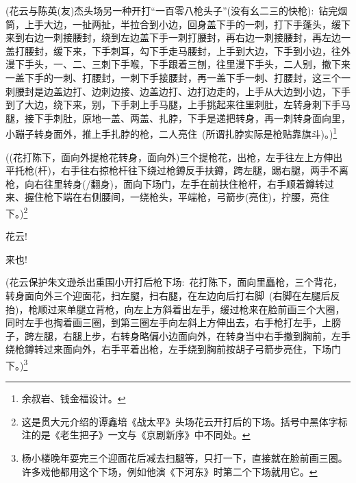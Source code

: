 {\vspace{5pt}
({花云与陈英(友)杰头场另一种开打``{\hei 一百零八枪头子}''}({没有幺二三的快枪}):~{\hwfs 钻完烟筒}，上手{\hwfs 大边}，{\hwfs 一扯两扯}，{\hwfs 半拉合到小边}，{\hwfs 回身盖}下手{\hwfs 的一刺}，{\hwfs 打}下手{\hwfs 蓬头}，{\hwfs 缓下来到右边一刺接腰封}，{\hwfs 绕到左边盖}下手{\hwfs 一刺打腰封}，{\hwfs 再右边一刺接腰封}，{\hwfs 再左边一盖打腰封}，{\hwfs 缓下来}，下手{\hwfs 刺耳}，{\hwfs 勾}下手{\hwfs 走马腰封}，上手{\hwfs 到大边}，下手{\hwfs 到小边}，{\hwfs 往外漫}下手{\hwfs 头}，{\hwfs 一}、{\hwfs 二}、{\hwfs 三刺}下手{\hwfs 喉}，下手{\hwfs 跟着三刨}，{\hwfs 往里漫下手头}，二人{\hwfs 别}，{\hwfs 撤下来一盖}下手{\hwfs 的一刺}、{\hwfs 打腰封}，{\hwfs 一刺}下手{\hwfs 接腰封}，{\hwfs 再一盖}下手{\hwfs 一刺}、{\hwfs 打腰封}，{\hwfs 这三个一刺腰封是边盖边打}、{\hwfs 边刺边接}、{\hwfs 边盖边打}、{\hwfs 边打边走的}，上手{\hwfs 从大边到小边}，下手{\hwfs 到了大边}，{\hwfs 绕下来}，{\hwfs 别}，下手{\hwfs 刺}上手{\hwfs 马腿}，上手{\hwfs 挑起来往里刺肚}，{\hwfs 左转身刺}下手{\hwfs 马腿}，{\hwfs 接}下手{\hwfs 刺肚}，{\hwfs 原地一盖}、{\hwfs 两盖}、{\hwfs 扎脖}，下手{\hwfs 是递把转身}，{\hwfs 再一刺转身面向里}，{\hwfs 小蹦子转身面外}，{\hwfs 推}上手{\hwfs 扎脖的枪}，二人{\hwfs 亮住}~({\hwfs 所谓扎脖实际是枪贴靠旗斗})。)\footnote{余叔岩、钱金福设计。}

\vspace{5pt}
((花{\hei 打}陈{\hei 下}，{\hei 面向外提枪花转身}，{\hei 面向外}){\hwfs 三个提枪花}，{\hwfs 出枪}，{\hwfs 左手往左上方伸出平托枪}({\hei 杆})，{\hwfs 右手往右掠枪杆往下绕过枪鐏反手扶鐏}，{\hwfs 跨左腿}，{\hwfs 踢右腿}，{\hwfs 两手不离枪}，{\hwfs 向右往里转身}(/{\hei 翻身})，{\hwfs 面向下场门}，{\hwfs 左手在前扶住枪杆}，{\hwfs 右手顺着鐏转过来}、{\hwfs 握住枪下端在右侧腰间}，{\hwfs 一绕枪头}，{\hwfs 平端枪}，{\hwfs 弓箭步}({\hei 亮住})，{\hwfs 拧腰}，{\hwfs 亮住下}。)\footnote{这是贯大元介绍的谭鑫培《战太平》头场花云开打后的下场。括号中黑体字标注的是《老生把子》一文与《京剧新序》中不同处。}

{\vspace{5pt}}

{花云!}

{来也!}

({花云保护朱文逊杀出重围{\hei 小开打后枪下场}:~}花{\hwfs 打}陈{\hwfs 下}，{\hwfs 面向里矗枪}，{\hwfs 三个背花}，{\hwfs 转身面向外三个迎面花}，{\hwfs 扫左腿}，{\hwfs 扫右腿}，{\hwfs 在左边向后打右脚}~({\hwfs 右脚在左腿后反抬})，{\hwfs 枪顺过来单腿立背枪}，{\hwfs 向左上方斜着出左手}，{\hwfs 缓过枪来在脸前画三个大圈}，{\hwfs 同时左手也掏着画三圈}，{\hwfs 到第三圈左手向左斜上方伸出去}，{\hwfs 右手枪打左手}，{\hwfs 上膀子}，{\hwfs 跨左腿}，{\hwfs 右腿上步}，{\hwfs 右转身略偏小边面向外}，{\hwfs 在转身当中右手撤到胸前}，{\hwfs 左手绕枪鐏转过来面向外}，{\hwfs 右手平着出枪}，{\hwfs 左手绕到胸前按胡子弓箭步亮住}，{\hwfs 下场门下}。)\footnote{杨小楼晚年耍完三个迎面花后减去扫腿等，只打一下，直接就在脸前画三圈。许多戏他都用这个下场，例如他演《下河东》时第二个下场就用它。}

}
